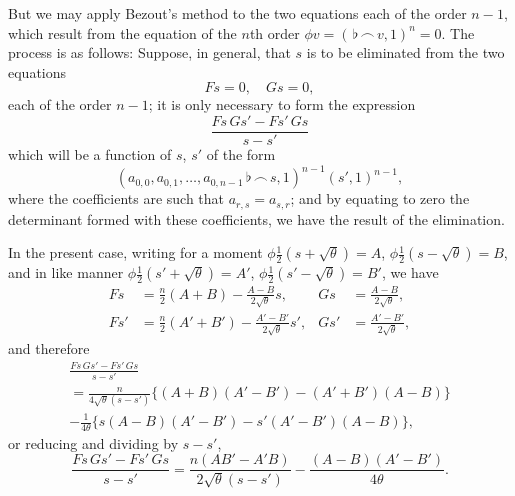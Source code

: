 \documentclass[11pt,a4paper]{article}
\theoremstyle{definition}
\begin{document}
But we may apply Bezout's method to the two equations each of the order $n-1$, which result from the equation of the $n$th order $\phi v=(\,\flat\,\frown\, v,1)^n=0$. The process is as follows: Suppose, in general, that $s$ is to be eliminated from the two equations
\[
Fs=0,\quad Gs=0,
\]
each of the order $n-1$; it is only necessary to form the expression
\[
\frac{Fs\,Gs'-Fs'\,Gs}{s-s'}
\]
which will be a function of $s$, $s'$ of the form
\[
(a_{0,0},a_{0,1},\ldots,a_{0,n-1}\,\flat\,\frown\, s,1)^{n-1}(s',1)^{n-1},
\]
where the coefficients are such that $a_{r,s}=a_{s,r}$; and by equating to zero the determinant formed with these coefficients, we have the result of the elimination.

In the present case, writing for a moment $\phi\tfrac{1}{2}(s+\sqrt{\theta})=A$, $\phi\tfrac{1}{2}(s-\sqrt{\theta})=B$, and in like manner $\phi\tfrac{1}{2}(s'+\sqrt{\theta})=A'$, $\phi\tfrac{1}{2}(s'-\sqrt{\theta})=B'$, we have
\begin{align*}
Fs &= \tfrac{n}{2}(A+B)-\frac{A-B}{2\sqrt{\theta}}s, & Gs &= \frac{A-B}{2\sqrt{\theta}},\\
Fs' &= \tfrac{n}{2}(A'+B')-\frac{A'-B'}{2\sqrt{\theta}}s', & Gs' &= \frac{A'-B'}{2\sqrt{\theta}},
\end{align*}
and therefore
\begin{multline*}
\frac{Fs\,Gs'-Fs'\,Gs}{s-s'}\\
=\frac{n}{4\sqrt{\theta}(s-s')}\{(A+B)(A'-B')-(A'+B')(A-B)\}\\
-\frac{1}{4\theta}\{s(A-B)(A'-B')-s'(A'-B')(A-B)\},
\end{multline*}
or reducing and dividing by $s-s'$,
\[
\frac{Fs\,Gs'-Fs'\,Gs}{s-s'}=\frac{n(AB'-A'B)}{2\sqrt{\theta}(s-s')}-\frac{(A-B)(A'-B')}{4\theta}.
\]
\end{document}
